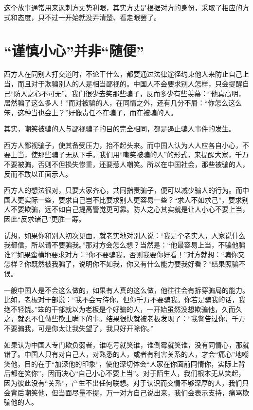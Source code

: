 \documentclass[fontset=fandol, a4paper, 12pt, openright]{ctexbook}
\begin{document}
这个故事通常用来讽刺方丈势利眼，其实方丈是根据对方的身份，采取了相应的方式和态度，只不过一开始就没弄清楚、看走眼罢了。

\section{“谨慎小心”并非“随便”}

西方人在同别人打交道时，不论干什么，都要通过法律途径约束他人来防止自己上当，而且对于欺骗别人的人是相当鄙视的。中国人不会要求别人怎样，只会提醒自己“防人之心不可无”。我们很少去笑那些骗子，反而多少有些羡慕：“他真高明，居然骗了这么多人！”而对被骗的人，在同情之外，还有几分不屑：“你怎么这么笨，这种当也会上？”好像责任不在骗子，而在被骗的人。

其实，嘲笑被骗的人与鄙视骗子的目的完全相同，都是遏止骗人事件的发生。

西方人鄙视骗子，使其备受压力，抬不起头来。而中国人认为人人应各自小心，不要上当，使那些骗子无从下手。我们用“嘲笑被骗的人”的形式，来提醒大家，千万不要被骗，否则不但损失惨重，还要惹人嘲笑。所以在中国社会，那些被骗的人，反而不敢以正面示人。

西方人的想法很对，只要大家齐心，共同指责骗子，便可以减少骗人的行为。而中国人更实际一些，要求自己岂不比要求别人更容易一些？“求人不如求己”，要求别人不要欺骗，远不如自己提高警觉更可靠。防人之心其实就是让人小心不要上当，因此“反求诸己”更胜一筹。

试想，如果你和别人初次见面，就老实地对别人说：“我是个老实人，人家说什么我都信，所以请不要骗我。”那对方会怎么想？当然是：“他最容易上当，不骗他骗谁?”如果蛮横地要求对方：“你不要骗我，否则我要你好看！”对方就想：“骗你又怎样？你既然被我骗了，说明你不如我，你又有什么能力要我好看？”结果照骗不误。

一般中国人是不会这么做的，如果有人真的这么做，他往往会有拆穿骗局的能力。比如，老板对干部说：“我不会亏待你，但你千万不要骗我。你若是骗我的话，我绝不轻饶。”笨的干部就以为老板是个好骗的人，一开始虽然没想欺骗他，久而久之，就忍不住做些欺上瞒下的事。结果很快就被老板发现了：“我警告过你，千万不要骗我，可是你太让我失望了，我只好开除你。”

如果认为中国人专门欺负弱者，谁吃亏就笑谁，谁倒霉就笑谁，没有同情心，那就错了。中国人只有对自己人，对熟悉的人，或者有利害关系的人，才会“痛心”地嘲笑他，目的在于“加深他的印象”，使他深切体会“人家在你面前同情你，实际上背后都在笑你”，因而决心“自己小心不要上当”。对于陌生人，我们根本无从笑起，因为彼此没有“关系”，产生不出任何联想。对于认识而交情不够深厚的人，我们只会背后嘲笑他，但当面尽量不提，万一对方自己说出来，我们会表示支持，痛骂欺骗他的人。
\end{document}
